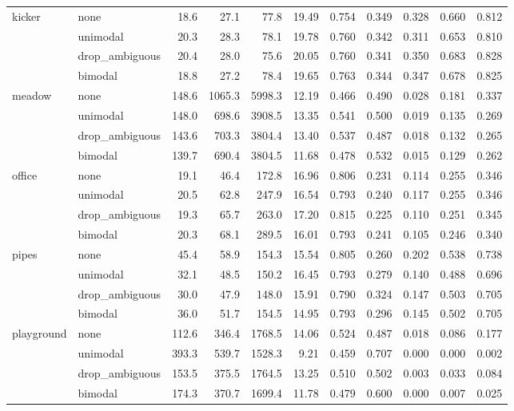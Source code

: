 \begin{table}[h]
\begin{tabular}{llrrrrrrrrr}
\midrule
\multirow{4}{*}{kicker} & none & 18.6 & 27.1 & 77.8 & 19.49 & 0.754 & 0.349 & 0.328 & 0.660 & 0.812 \\
 & unimodal & 20.3 & 28.3 & 78.1 & 19.78 & 0.760 & 0.342 & 0.311 & 0.653 & 0.810 \\
 & drop_ambiguous & 20.4 & 28.0 & 75.6 & 20.05 & 0.760 & 0.341 & 0.350 & 0.683 & 0.828 \\
 & bimodal & 18.8 & 27.2 & 78.4 & 19.65 & 0.763 & 0.344 & 0.347 & 0.678 & 0.825 \\
\midrule
\multirow{4}{*}{meadow} & none & 148.6 & 1065.3 & 5998.3 & 12.19 & 0.466 & 0.490 & 0.028 & 0.181 & 0.337 \\
 & unimodal & 148.0 & 698.6 & 3908.5 & 13.35 & 0.541 & 0.500 & 0.019 & 0.135 & 0.269 \\
 & drop_ambiguous & 143.6 & 703.3 & 3804.4 & 13.40 & 0.537 & 0.487 & 0.018 & 0.132 & 0.265 \\
 & bimodal & 139.7 & 690.4 & 3804.5 & 11.68 & 0.478 & 0.532 & 0.015 & 0.129 & 0.262 \\
\midrule
\multirow{4}{*}{office} & none & 19.1 & 46.4 & 172.8 & 16.96 & 0.806 & 0.231 & 0.114 & 0.255 & 0.346 \\
 & unimodal & 20.5 & 62.8 & 247.9 & 16.54 & 0.793 & 0.240 & 0.117 & 0.255 & 0.346 \\
 & drop_ambiguous & 19.3 & 65.7 & 263.0 & 17.20 & 0.815 & 0.225 & 0.110 & 0.251 & 0.345 \\
 & bimodal & 20.3 & 68.1 & 289.5 & 16.01 & 0.793 & 0.241 & 0.105 & 0.246 & 0.340 \\
\midrule
\multirow{4}{*}{pipes} & none & 45.4 & 58.9 & 154.3 & 15.54 & 0.805 & 0.260 & 0.202 & 0.538 & 0.738 \\
 & unimodal & 32.1 & 48.5 & 150.2 & 16.45 & 0.793 & 0.279 & 0.140 & 0.488 & 0.696 \\
 & drop_ambiguous & 30.0 & 47.9 & 148.0 & 15.91 & 0.790 & 0.324 & 0.147 & 0.503 & 0.705 \\
 & bimodal & 36.0 & 51.7 & 154.5 & 14.95 & 0.793 & 0.296 & 0.145 & 0.502 & 0.705 \\
\midrule
\multirow{4}{*}{playground} & none & 112.6 & 346.4 & 1768.5 & 14.06 & 0.524 & 0.487 & 0.018 & 0.086 & 0.177 \\
 & unimodal & 393.3 & 539.7 & 1528.3 & 9.21 & 0.459 & 0.707 & 0.000 & 0.000 & 0.002 \\
 & drop_ambiguous & 153.5 & 375.5 & 1764.5 & 13.25 & 0.510 & 0.502 & 0.003 & 0.033 & 0.084 \\
 & bimodal & 174.3 & 370.7 & 1699.4 & 11.78 & 0.479 & 0.600 & 0.000 & 0.007 & 0.025 \\

\end{tabular}
\end{table}
